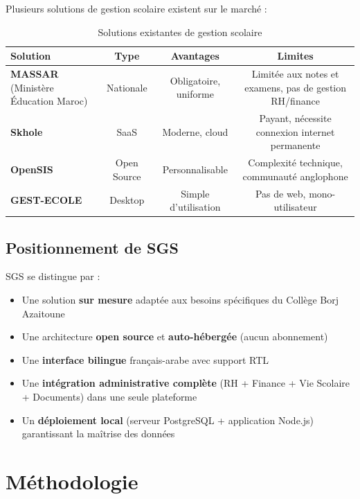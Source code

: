 \documentclass[12pt,a4paper]{report}
\begin{document}
Plusieurs solutions de gestion scolaire existent sur le marché :

\begin{table}[H]
\centering
\caption{Solutions existantes de gestion scolaire}
\label{tab:solutions}
\begin{tabularx}{\textwidth}{lccc}
\toprule
\textbf{Solution} & \textbf{Type} & \textbf{Avantages} & \textbf{Limites} \\
\midrule
\textbf{MASSAR} (Ministère Éducation Maroc) & Nationale & Obligatoire, uniforme & Limitée aux notes et examens, pas de gestion RH/finance \\
\addlinespace
\textbf{Skhole} & SaaS & Moderne, cloud & Payant, nécessite connexion internet permanente \\
\addlinespace
\textbf{OpenSIS} & Open Source & Personnalisable & Complexité technique, communauté anglophone \\
\addlinespace
\textbf{GEST-ECOLE} & Desktop & Simple d'utilisation & Pas de web, mono-utilisateur \\
\bottomrule
\end{tabularx}
\end{table}

\section{Positionnement de SGS}

SGS se distingue par :

\begin{itemize}
    \item Une solution \textbf{sur mesure} adaptée aux besoins spécifiques du Collège Borj Azaitoune
    \item Une architecture \textbf{open source} et \textbf{auto-hébergée} (aucun abonnement)
    \item Une \textbf{interface bilingue} français-arabe avec support RTL
    \item Une \textbf{intégration administrative complète} (RH + Finance + Vie Scolaire + Documents) dans une seule plateforme
    \item Un \textbf{déploiement local} (serveur PostgreSQL + application Node.js) garantissant la maîtrise des données
\end{itemize}

\chapter{Méthodologie}
\end{document}
